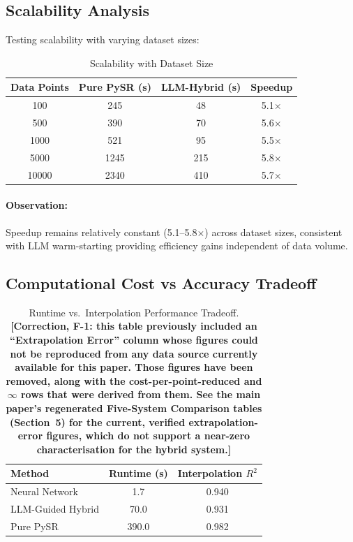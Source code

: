 \documentclass[twoside,11pt]{article}
\begin{document}
\subsection{Scalability Analysis}

Testing scalability with varying dataset sizes:

\begin{table}[H]
\centering
\caption{Scalability with Dataset Size}
\label{tab:scalability}
\begin{tabular}{@{}cccc@{}}
\toprule
\textbf{Data Points} & \textbf{Pure PySR (s)} & \textbf{LLM-Hybrid (s)} & \textbf{Speedup} \\
\midrule
100 & 245 & 48 & 5.1$\times$ \\
500 & 390 & 70 & 5.6$\times$ \\
1000 & 521 & 95 & 5.5$\times$ \\
5000 & 1245 & 215 & 5.8$\times$ \\
10000 & 2340 & 410 & 5.7$\times$ \\
\bottomrule
\end{tabular}
\end{table}

\paragraph{Observation:} Speedup remains relatively constant (5.1--5.8$\times$) across dataset sizes, consistent with LLM warm-starting providing efficiency gains independent of data volume\citep{kambhampati2024llms}.

\subsection{Computational Cost vs Accuracy Tradeoff}

\begin{table}[H]
\centering
\caption{Runtime vs.\ Interpolation Performance Tradeoff. \textbf{[Correction,
  F-1: this table previously included an ``Extrapolation Error'' column
  whose figures could not be reproduced from any data source currently
  available for this paper. Those figures have been removed, along with the
  cost-per-point-reduced and $\infty$ rows that were derived from them. See
  the main paper's regenerated Five-System Comparison tables (Section~5)
  for the current, verified extrapolation-error figures, which do not
  support a near-zero characterisation for the hybrid system.]}}
\label{tab:cost_accuracy_tradeoff}
\begin{tabular}{lcc}
\toprule
\textbf{Method} & \textbf{Runtime (s)} & \textbf{Interpolation $R^2$} \\
\midrule
Neural Network & 1.7 & 0.940 \\
LLM-Guided Hybrid & 70.0 & 0.931 \\
Pure PySR & 390.0 & 0.982 \\
\bottomrule
\end{tabular}
\end{table}
\end{document}
